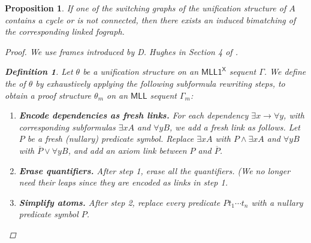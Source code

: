 \documentclass[conference,twosided,10pt]{IEEEtran}
\newtheorem{proposition}[thm]{Proposition}
\theoremstyle{definition}
\newtheorem{definition}[thm]{Definition}
\newcommand*{\MLL}{\mathsf{MLL}}
\newcommand*{\FOMLL}{\mathsf{MLL1^X}}
\newcommand{\cor}{\vee}
\newcommand{\cand}{\wedge}
\begin{document}
\begin{proposition}
If one of the switching graphs of the unification structure of $A$
contains a cycle or is not connected, then there exists an induced bimatching of the
corresponding linked fograph.
\begin{proof}
We use frames introduced by D. Hughes in Section 4 of \cite{hughes:unifn}.

\begin{definition}
Let $\theta$ be a unification structure on an $\FOMLL$ sequent $\Gamma$.
We define the   of $\theta$ by exhaustively applying the following subformula rewriting steps, to obtain a proof structure $\theta_m$ on an $\MLL$ sequent $\Gamma_m$:

\begin{enumerate}
  \item {\bf Encode dependencies as fresh links.} For each dependency $\exists x
	  \rightarrow \forall y$, with corresponding subformulas $\exists x A$
		and $\forall y B$, we add a fresh link as follows. Let $P$ be a
		fresh (nullary) predicate symbol. Replace $\exists x A$ with $P
		\cand \exists x A$ and $\forall y B$ with $\overline{P} \cor \forall y B$, and add an axiom link between $P$ and $\overline{P}$.
  \item {\bf Erase quantifiers.} After step 1, erase all the quantifiers. (We no longer need their leaps since they are encoded as links in step 1.
  \item {\bf Simplify atoms.} After step 2, replace every predicate $Pt_1 \cdots t_n$ with a nullary predicate symbol $P$.
\end{enumerate}
\end{definition}

\begin{figure}
\begin{center}
\vspace{1.5ex}


\end{center}
\end{figure}
\end{proof}
\end{proposition}
\end{document}
